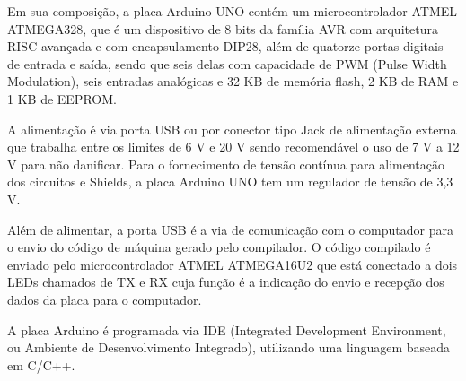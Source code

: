 Em sua composição, a placa Arduino UNO contém um microcontrolador ATMEL ATMEGA328, que é um dispositivo de 8 bits da 
família AVR com arquitetura RISC avançada e com encapsulamento DIP28, além de quatorze portas digitais de entrada e saída,
sendo que seis delas com capacidade de PWM (Pulse Width Modulation), seis entradas analógicas e 32 KB de memória flash, 
2 KB de RAM e 1 KB de EEPROM. 

A alimentação é via porta USB ou por conector tipo Jack de alimentação externa que trabalha entre os limites de 6 V e 
20 V sendo recomendável o uso de 7 V a 12 V para não danificar. Para o fornecimento de tensão contínua para alimentação 
dos circuitos e Shields, a placa Arduino UNO tem um regulador de tensão de 3,3 V.

Além de alimentar, a porta USB é a via de comunicação com o computador para o envio do código de máquina gerado 
pelo compilador. O código compilado é enviado pelo microcontrolador ATMEL ATMEGA16U2 que está conectado a dois LEDs 
chamados de TX e RX cuja função é a indicação do envio e recepção dos dados da placa para o computador.

A placa Arduino é programada via IDE (Integrated Development Environment, ou Ambiente de Desenvolvimento Integrado), 
utilizando uma linguagem baseada em C/C++.


